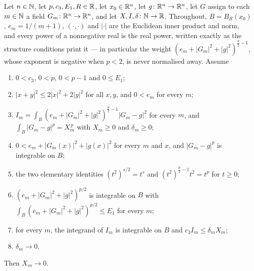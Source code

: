 \begin{helper}
Let $n\in\mathbb{N}$, let $p,c_3,E_1,R\in\mathbb{R}$, let $x_0\in\mathbb{R}^n$, let
$g\colon\mathbb{R}^n\to\mathbb{R}^n$, let $G$ assign to each $m\in\mathbb{N}$ a field
$G_m\colon\mathbb{R}^n\to\mathbb{R}^n$, and let $X,I,\delta\colon\mathbb{N}\to\mathbb{R}$.  Throughout,
$B=B_R(x_0)$, $e_m=1/(m+1)$, $(\cdot,\cdot)$ and $|\cdot|$ are the Euclidean
inner product and norm, and every power of a nonnegative real is the real
power, written exactly as the structure conditions print it --- in particular
the weight $(e_m+|G_m|^2+|g|^2)^{\frac p2-1}$, whose exponent is negative when
$p<2$, is never normalised away.  Assume
\begin{enumerate}
\item[(H1)] $0<c_3$, $0<p$, $0<p-1$ and $0\le E_1$;
\item[(H2)] $|x+y|^2\le2|x|^2+2|y|^2$ for all $x,y$, and $0<e_m$ for every $m$;
\item[(H3)] $I_m=\int_B(e_m+|G_m|^2+|g|^2)^{\frac p2-1}|G_m-g|^2$ for every $m$,
  and $\int_B|G_m-g|^p=X_m^{\,p}$ with $X_m\ge0$ and $\delta_m\ge0$;
\item[(H4)] $0<e_m+|G_m(x)|^2+|g(x)|^2$ for every $m$ and $x$, and
  $|G_m-g|^p$ is integrable on $B$;
\item[(H5)] the two elementary identities $(t^2)^{s/2}=t^s$ and
  $(t^2)^{\frac p2-1}t^2=t^p$ for $t\ge0$;
\item[(H6)] $(e_m+|G_m|^2+|g|^2)^{p/2}$ is integrable on $B$ with
  $\int_B(e_m+|G_m|^2+|g|^2)^{p/2}\le E_1$ for every $m$;
\item[(H7)] for every $m$, the integrand of $I_m$ is integrable on $B$ and
  $c_3I_m\le\delta_mX_m$;
\item[(H8)] $\delta_m\to0$.
\end{enumerate}
Then $X_m\to0$.
\end{helper}
